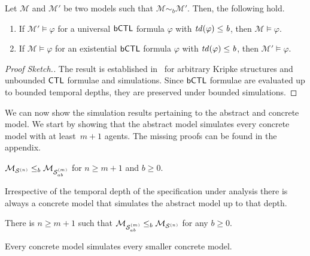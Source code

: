 \begin{theorem} Let $\mathcal M$ and $\mathcal M'$ be two models such that $\mathcal
M \sim_b  \mathcal M'$. Then, the following hold.
\label{th:sim}
\begin{enumerate}
    \item If $\mathcal M' \models \varphi$ for a universal $\sf{bCTL}$ formula
    $\varphi$ with $\it{td}(\varphi) \leq b$, then $\mathcal M \models
    \varphi$.
    \item If $\mathcal M \models \varphi$ for an existential $\sf{bCTL}$ formula
    $\varphi$ with $\it{td}(\varphi) \leq b$, then $\mathcal M' \models
    \varphi$.
\end{enumerate}
\end{theorem}
\begin{proof}[Proof Sketch.]
The result is established in~\cite{ClarkeGrumbergLong94} for arbitrary Kripke
structures and unbounded $\sf{CTL}$ formulae and simulations. Since $\sf{bCTL}$ formulae
are evaluated up to bounded temporal depths, they are preserved under bounded
simulations.
\end{proof}

We can now show the simulation results pertaining to the abstract and concrete
model.  We start by showing that the abstract model simulates every concrete
model with at least~$m+1$ agents. The missing proofs can be found in the
appendix.

\begin{theorem}
\label{th:ab-concr-sim}
$\mathcal{M}_{\mathcal{S}^{(n)}} \leq_b \mathcal{M}_{\mathcal{S}_{ab}^{(m)}}$ for $n \geq m+1$ and $b \geq 0$.
\end{theorem}

Irrespective of the temporal depth of the specification under
analysis there is always a concrete model that simulates the abstract model up
to that depth.

\begin{theorem}
\label{th:concr-ab-sim}
There is $n \geq m+1$ such that $\mathcal{M}_{\mathcal{S}_{ab}^{(m)}} \leq_b \mathcal{M}_{\mathcal{S}^{(n)}}$ for any $b \geq 0$.
\end{theorem}


Every concrete model simulates every smaller concrete model.

